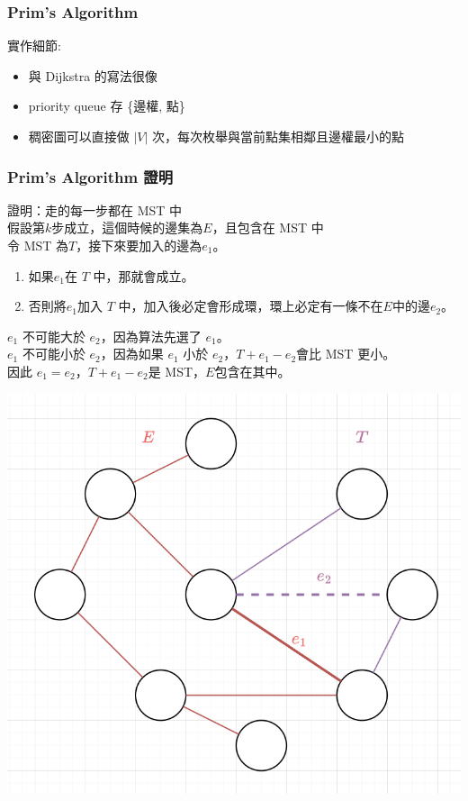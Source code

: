 \documentclass[aspectratio=169]{beamer}
\begin{document}
    \begin{frame}
        \frametitle{Prim's Algorithm}
        實作細節:
        \begin{itemize}
            \item 與 Dijkstra 的寫法很像
            \item priority queue 存 \{邊權, 點\}
            \item 稠密圖可以直接做 $|V|$ 次，每次枚舉與當前點集相鄰且邊權最小的點
        \end{itemize}
    \end{frame}
    
    \begin{frame}
        \frametitle{Prim's Algorithm 證明}
        證明：走的每一步都在 MST 中\\
        假設第$k$步成立，這個時候的邊集為$E$，且包含在 MST 中 \\
        令 MST 為$T$，接下來要加入的邊為$e_1$。\\
        \begin{enumerate}
            \item 如果$e_1$在 $T$ 中，那就會成立。
            \item 否則將$e_1$加入 $T$ 中，加入後必定會形成環，環上必定有一條不在$E$中的邊$e_2$。
        \end{enumerate}
        $e_1$ 不可能大於 $e_2$，因為算法先選了 $e_1$。\\
        $e_1$ 不可能小於 $e_2$，因為如果 $e_1$ 小於 $e_2$，$T+e_1-e_2$會比 MST 更小。\\
        因此 $e_1=e_2$，$T+e_1-e_2$是 MST，$E$包含在其中。
        \begin{center}
            \includegraphics[scale=0.16]{images/prim_proof.png}
        \end{center}
    \end{frame}
\end{document}
